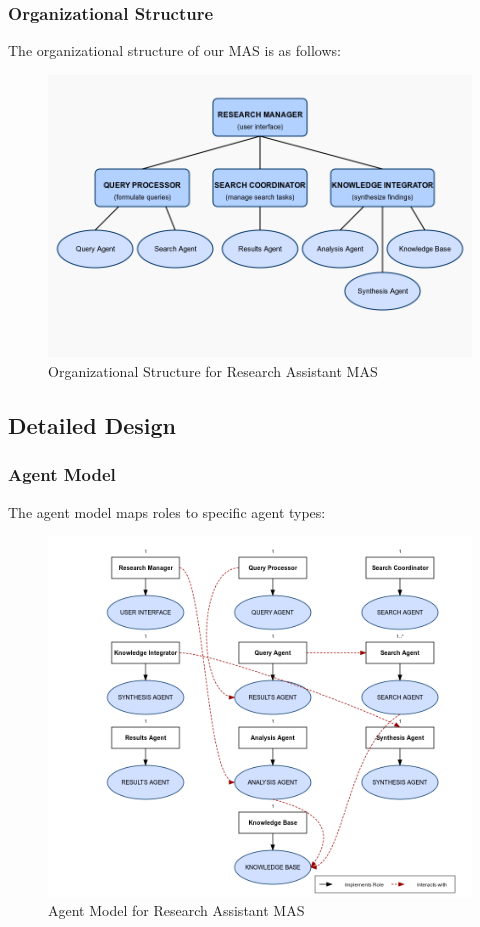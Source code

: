 \documentclass[11pt,a4paper]{article}
\begin{document}
\subsubsection{Organizational Structure}
The organizational structure of our MAS is as follows:

\begin{figure}[H]
    \centering
    \includegraphics[width=\textwidth]{images/organizational-structure.png}
    \caption{Organizational Structure for Research Assistant MAS}
    \label{fig:org-structure}
\end{figure}

\subsection{Detailed Design}

\subsubsection{Agent Model}
The agent model maps roles to specific agent types:

\begin{figure}[H]
    \centering
    \includegraphics[width=\textwidth]{images/agent-model.png}
    \caption{Agent Model for Research Assistant MAS}
    \label{fig:agent-model}
\end{figure}
\end{document}
